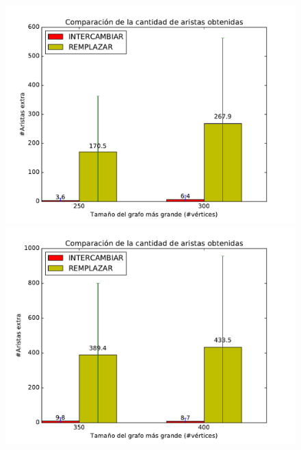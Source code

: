 \begin{figure}[H]
\begin{minipage}{0.49\textwidth}
  \centering
    \includegraphics[width=1\textwidth]{graficos/problema_6/calidad4.pdf}
  \caption{\footnotesize{}}
  \label{fig:calidad5-3}
\end{minipage}%
\hspace{0.01\textwidth}
\begin{minipage}{0.49\textwidth}   
  \centering
    \includegraphics[width=1\textwidth]{graficos/problema_6/calidad6.pdf} 
  \caption{\footnotesize{}}
  \label{fig:calidad5-4}
\end{minipage}


\end{figure}
